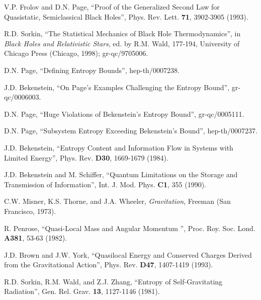 \documentclass[12pt]{article}
\newcommand{\comment}[1]{}
\newcommand{\keywords}[1]{}
\begin{document}
\begin{thebibliography}{999}
\comment{article} V.P. Frolov and D.N. Page, ``Proof of
the Generalized Second Law for Quasistatic, Semiclassical Black
Holes'', Phys. Rev. Lett. {\bf 71}, 3902-3905 (1993).
\keywords{black hole thermodynamics, generalized second law}

\comment{inbook} R.D. Sorkin, ``The Statistical Mechanics
of Black Hole Thermodynamics'', in {\it Black Holes and Relativistic
Stars}, ed. by R.M. Wald, 177-194, University of Chicago Press
(Chicago, 1998); gr-qc/9705006.  \keywords{black hole thermodynamics,
generalized second law}

\comment{online} D.N. Page, ``Defining Entropy
Bounds'', hep-th/0007238.

\comment{online} J.D. Bekenstein, ``On Page's Examples
Challenging the Entropy Bound'', gr-qc/0006003.

\comment{online} D.N. Page, ``Huge Violations of
Bekenstein's Entropy Bound'', gr-qc/0005111.

\comment{online} D.N. Page, ``Subsystem Entropy Exceeding Bekenstein's Bound'', hep-th/0007237.

\comment{article} J.D. Bekenstein, ``Entropy Content and
Information Flow in Systems with Limited Energy'', Phys. Rev. {\bf
D30}, 1669-1679 (1984).  \keywords{black hole thermodynamics,
statistical mechanics, generalized second law, entropy bounds}

\comment{article} J.D. Bekenstein and M. Schiffer,
``Quantum Limitations on the Storage and Transmission of
Information'', Int. J. Mod. Phys. {\bf C1}, 355 (1990).
\keywords{statistical mechanics, entropy bounds}

\comment{book} C.W. Misner, K.S. Thorne, and J.A. Wheeler,
{\it Gravitation}, Freeman (San Francisco, 1973).

\comment{article} R. Penrose, ``Quasi-Local Mass and
Angular Momentum '', Proc. Roy. Soc. Lond. {\bf A381}, 53-63 (1982).
\keywords{energy and momentum}

\comment{article} J.D. Brown and J.W. York, ``Quasilocal
Energy and Conserved Charges Derived from the Gravitational Action'',
Phys. Rev. {\bf D47}, 1407-1419 (1993).  \keywords{energy and momentum}

\comment{article} R.D. Sorkin, R.M. Wald, and Z.J. Zhang,
``Entropy of Self-Gravitating Radiation'', Gen. Rel. Grav. {\bf 13},
1127-1146 (1981).  \keywords{black hole thermodynamics, statistical
mechanics, entropy bounds}


\end{thebibliography}
\end{document}
